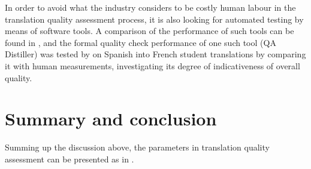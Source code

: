 \documentclass[output=paper]{langsci/langscibook}
\begin{document}
In order to avoid what the industry considers to be costly human labour in the translation quality assessment process, it is also looking for automated testing by means of software tools. A comparison of the performance of such tools can be found in \citet{Debove2011}, and the formal quality check performance of one such tool (QA Distiller) was tested by \citet{Depraetere2011} on Spanish into French student translations by comparing it with human measurements, investigating its degree of indicativeness of overall quality.

\section{Summary and conclusion}\label{sec:vandepitte:6}

Summing up the discussion above, the parameters in translation quality assessment can be presented as in . 
\end{document}
